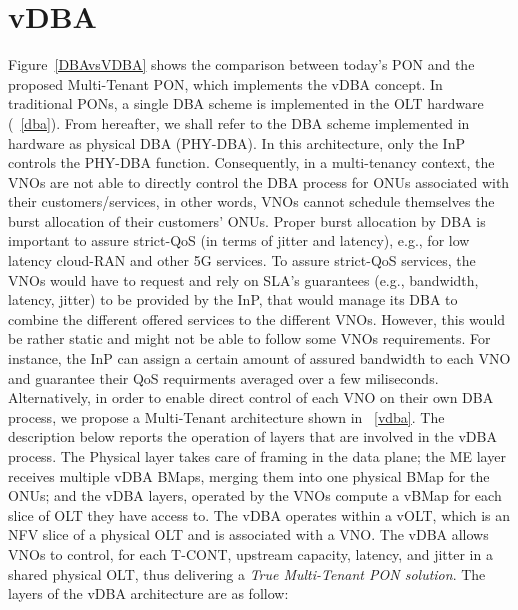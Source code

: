 \section{\acf{vDBA} }
Figure~\ref{DBAvsVDBA} shows the comparison between today's \ac{PON} and the proposed Multi-Tenant \ac{PON}, which implements the \ac{vDBA} concept. 
In traditional \acp{PON}, a single \ac{DBA} scheme is implemented in the \ac{OLT} hardware (\figureautorefname~\ref{dba}). From hereafter, we shall refer to the \ac{DBA} scheme implemented in hardware as physical \ac{DBA} (PHY-\ac{DBA}). In this architecture, only the \ac{InP} controls the PHY-\ac{DBA} function. Consequently, in a multi-tenancy context, the \acp{VNO} are not able to directly control the \ac{DBA} process for \acp{ONU} associated with their customers/services, in other words, \acp{VNO} cannot schedule themselves the burst allocation of their customers' \acp{ONU}. Proper burst allocation by \ac{DBA} is important to assure strict-\ac{QoS} (in terms of jitter and latency), e.g., for low latency cloud-RAN and other \ac{5G} services. To assure strict-\ac{QoS} services, the \acp{VNO} would have to request and rely on \ac{SLA}'s guarantees (e.g., bandwidth, latency, jitter) to be provided by the \ac{InP}, that would manage its \ac{DBA} to combine the different offered services to the different \acp{VNO}. However, this would be rather static and might not be able to follow some \acp{VNO} requirements. For instance, the \ac{InP} can assign a certain amount of assured bandwidth to each \ac{VNO} and guarantee their \ac{QoS} requirments averaged over a few miliseconds.
 Alternatively, in order to enable direct control of each \ac{VNO} on their own \ac{DBA} process, we propose a Multi-Tenant architecture shown in \figureautorefname~\ref{vdba}. The description below reports the operation of layers that are involved in the \ac{vDBA} process. The Physical layer takes care of framing in the data plane; the \ac{ME} layer receives multiple \ac{vDBA} \acp{BMap}, merging them into one physical \ac{BMap} for the \acp{ONU}; and the \ac{vDBA} layers, operated by the \acp{VNO} compute a \ac{vBMap} for each slice of \ac{OLT} they have access to.
 The \ac{vDBA} operates within a \ac{vOLT}, which is an NFV slice of a physical \ac{OLT} and is associated with a \ac{VNO}. The \ac{vDBA} allows \acp{VNO} to control, for each \ac{T-CONT}, upstream capacity, latency, and jitter in a shared physical \ac{OLT}, thus delivering a\textit{ True Multi-Tenant \ac{PON} solution}. The layers of the \ac{vDBA} architecture are as follow:
 





